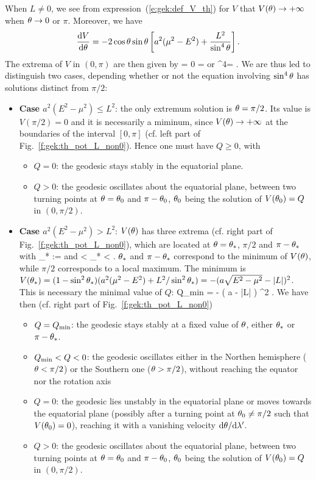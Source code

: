 When $L\not=0$, we see from expression~(\ref{e:gek:def_V_th}) for $V$ that
$V(\theta) \to +\infty$ when $\theta\to 0$ or $\pi$. Moreover, we have
\[
    \frac{\mathrm{d} V}{\mathrm{d} \theta} = - 2 \cos\theta\sin\theta \left[ a^2 (\mu^2 - E^2) + \frac{L^2}{\sin^4\theta} \right] .
\]
The extrema of $V$ in $(0,\pi)$ are then given by
\be
     = 0 \iff
        \th =  \quad\mbox{or}\quad
        \sin^4\th =  .
\ee
We are thus led to distinguish two cases, depending whether or not the
equation involving $\sin^4\theta$ has solutions distinct from $\pi/2$:
\begin{itemize}
\item \textbf{Case $a^2(E^2 - \mu^2) \leq L^2$}: the only extremum solution is
$\theta=\pi/2$.
Its value is $V(\pi/2)=0$ and it is
necessarily a miminum, since $V(\theta) \to +\infty$ at the boundaries of the
interval $[0,\pi]$ (cf. left part of Fig.~\ref{f:gek:th_pot_L_non0}).
Hence one must have $Q\geq 0$, with
\begin{itemize}
\item $Q=0$: the geodesic stays stably in the
equatorial plane.
\item $Q>0$: the geodesic oscillates about the equatorial plane,
between two turning points at $\theta=\theta_0$ and $\pi-\theta_0$, $\theta_0$ being the solution
of $V(\theta_0) = Q$ in $(0,\pi/2)$.
\end{itemize}
\item \textbf{Case $a^2(E^2 - \mu^2) > L^2$}: $V(\theta)$ has three extrema (cf. right part of Fig.~\ref{f:gek:th_pot_L_non0}), which are located at
$\theta=\theta_*$, $\pi/2$ and $\pi-\theta_*$ with
\be
    \th_* := \arcsin{}
    \quad\mbox{and} < \th_* <  .
\ee
$\theta_*$ and $\pi-\theta_*$ correspond to the minimum of $V(\theta)$,
while $\pi/2$ corresponds to a local maximum. The minimum is
$V(\theta_*) = (1-\sin^2\theta_*)(a^2(\mu^2-E^2) + L^2/\sin^2\theta_*) = - (a \sqrt{E^2 - \mu^2} - |L|)^2$.
This is necessary the minimal value of $Q$:
\be
    Q_{\rm min} = - \left( a  - |L| \right) ^2 .
\ee
We have then (cf. right part of Fig.~\ref{f:gek:th_pot_L_non0})
\begin{itemize}
\item $Q = Q_{\rm min}$: the geodesic stays stably at a fixed value of $\theta$,
either $\theta_*$ or $\pi - \theta_*$.
\item $Q_{\rm min} < Q < 0$: the geodesic oscillates either in the Northen
hemisphere ($\theta < \pi/2$) or the Southern one ($\theta > \pi/2$), without reaching
the equator nor the rotation axis
\item $Q=0$: the geodesic lies unstably in the equatorial plane or
moves towards the equatorial plane (possibly after a turning point at $\theta_0\neq\pi/2$ such that
$V(\theta_0)=0$), reaching it with a vanishing velocity $\mathrm{d}\theta/\mathrm{d}\lambda'$.
\item $Q>0$: the geodesic oscillates about the equatorial plane,
between two turning points at $\theta=\theta_0$ and $\pi-\theta_0$, $\theta_0$ being the solution
of $V(\theta_0) = Q$ in $(0,\pi/2)$.
\end{itemize}
\end{itemize}

